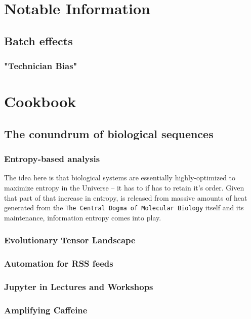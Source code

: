 \documentclass[11.5pt]{report}
\begin{document}
\part{Notable Information}
\chapter{Batch effects}
\section{"Technician Bias"}





\part{Cookbook}
\chapter{The conundrum of biological sequences}
\section{Entropy-based analysis}
The idea here is that biological systems are essentially highly-optimized to maximize entropy in the Universe -- it has to if has to retain it's order. Given that part of that increase in entropy, is released from massive amounts of heat generated from the \texttt{The Central Dogma of Molecular Biology} itself and its maintenance, information entropy comes into play. 

\section{Evolutionary Tensor Landscape}

\section{Automation for RSS feeds}

\section{Jupyter in Lectures and Workshops}

\section{Amplifying Caffeine}
\end{document}
